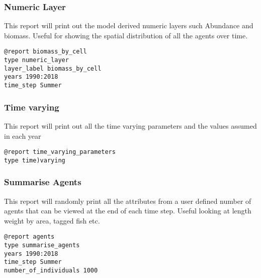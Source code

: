 \subsubsection{Numeric Layer}
This report will print out the model derived numeric layers such Abundance and biomass. Useful for showing the spatial distribution of all the agents over time.
{\small{\begin{verbatim}
@report biomass_by_cell
type numeric_layer
layer_label biomass_by_cell
years 1990:2018
time_step Summer
\end{verbatim}}}


\subsubsection{Time varying}
This report will print out all the time varying parameters and the values assumed in each year
{\small{\begin{verbatim}
@report time_varying_parameters
type time)varying
\end{verbatim}}}


\subsubsection{Summarise Agents}
This report will randomly print all the attributes from a user defined number of agents that can be viewed at the end of each time step. Useful looking at length weight by area, tagged fish etc.
{\small{\begin{verbatim}
@report agents
type summarise_agents
years 1990:2018
time_step Summer
number_of_individuals 1000
\end{verbatim}}}

